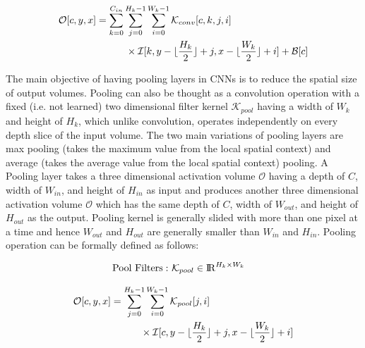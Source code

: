 \begin{equation}
\label{eqn:conv_operator}
\begin{split}
\mathcal{O}[c,y,x] &= \sum_{k=0}^{C_{in}} \sum_{j=0}^{H_k-1} \sum_{i=0}^{W_k-1} \mathcal{K}_{conv}[c, k, j, i] \\ & \quad \quad \quad \times \mathcal{I}[k,y-\lfloor\frac{H_k}{2}\rfloor+j,x-\lfloor\frac{W_k}{2}\rfloor+i] + \mathcal{B}[c]
\end{split}
\end{equation}

The main objective of having pooling layers in CNNs is to reduce the spatial size of output volumes. Pooling can also be thought as a convolution operation with a fixed (i.e. not learned) two dimensional filter kernel $\mathcal{K}_{pool}$ having a width of $W_k$ and height of $H_k$, which unlike convolution, operates independently on every depth slice of the input volume. The two main variations of pooling layers are max pooling (takes the maximum value from the local spatial context) and average (takes the average value from the local spatial context) pooling. A Pooling layer takes a three dimensional activation volume $\mathcal{O}$ having a depth of $C$, width of $W_{in}$, and height of $H_{in}$ as input and produces another three dimensional activation volume $\mathcal{O}$ which has the same depth of $C$, width of $W_{out}$, and height of $H_{out}$ as the output. Pooling kernel is generally slided with more than one pixel at a time and hence $W_{out}$ and $H_{out}$ are generally smaller than $W_{in}$ and $H_{in}$. Pooling operation can be formally defined as follows:

\vspace{-2mm}
\begin{align}
\text{Pool Filters}:&~ \mathcal{K}_{pool} \in \mathcal{\rm I\!R}^{H_{k} \times W_{k}}
\end{align}

\begin{equation}
\label{eqn:pool_operator}
\begin{split}
\mathcal{O}[c,y,x] &= \sum_{j=0}^{H_k-1} \sum_{i=0}^{W_k-1} \mathcal{K}_{pool}[j, i] \\ & \quad \quad \quad \times \mathcal{I}[c,y-\lfloor\frac{H_k}{2}\rfloor+j,x-\lfloor\frac{W_k}{2}\rfloor+i]
\end{split}
\end{equation}


